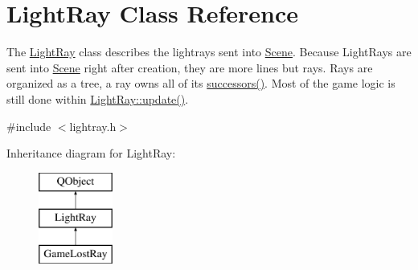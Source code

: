 \hypertarget{class_light_ray}{\section{Light\+Ray Class Reference}
\label{class_light_ray}
}


The \hyperlink{class_light_ray}{Light\+Ray} class describes the lightrays sent into \hyperlink{class_scene}{Scene}.  Because Light\+Rays are sent into \hyperlink{class_scene}{Scene} right after creation, they are more lines but rays. Rays are organized as a tree, a ray owns all of its \hyperlink{class_light_ray_a6673a77eb8fcd32dcfde26a1b112d303}{successors()}. Most of the game logic is still done within \hyperlink{class_light_ray_acf06a71a307433fa5b220baccf809e64}{Light\+Ray\+::update()}.  




{\ttfamily \#include $<$lightray.\+h$>$}

Inheritance diagram for Light\+Ray\+:\begin{figure}[H]
\begin{center}
\leavevmode
\includegraphics[height=3.000000cm]{class_light_ray}
\end{center}
\end{figure}
